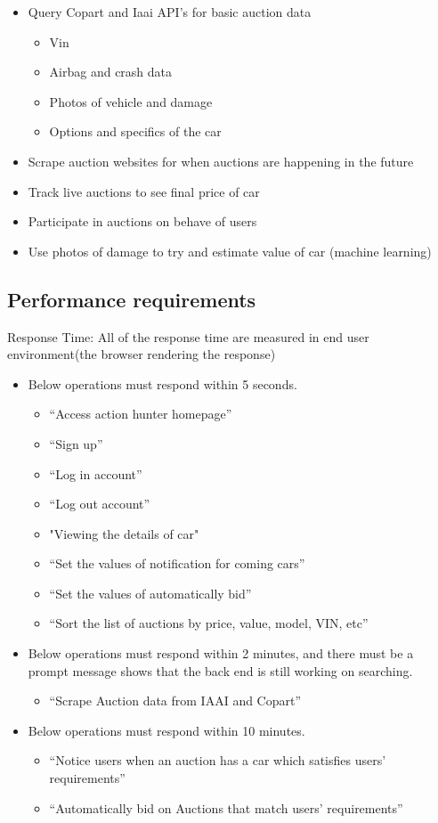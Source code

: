 \documentclass[draftclsnofoot,onecolumn,10pt]{IEEEtran}
\begin{document}
\begin{itemize}
    \item Query Copart and Iaai API's for basic auction data
    \begin{itemize}
        \item Vin
        \item Airbag and crash data
        \item Photos of vehicle and damage
        \item Options and specifics of the car
    \end{itemize}
    \item Scrape auction websites for when auctions are happening in the future
    \item Track live auctions to see final price of car
    \item Participate in auctions on behave of users
    \item Use photos of damage to try and estimate value of car (machine learning)
\end{itemize}

\subsection{Performance requirements}
Response Time: All of the response time are measured in end user environment(the browser rendering the response)
\begin{itemize}
\item Below operations must respond within 5 seconds.
\begin{itemize}
    \item “Access action hunter homepage”
    \item “Sign up”
    \item “Log in account”
    \item “Log out account”
    \item "Viewing the details of car"
    \item “Set the values of notification for coming cars”  
    \item “Set the values of automatically bid”
    \item “Sort the list of auctions by price, value, model, VIN, etc”
\end{itemize}
\item Below operations must respond within 2 minutes, and there must be a prompt message shows that the back end is still working on searching.
\begin{itemize}
    \item “Scrape Auction data from IAAI and Copart”
\end{itemize}
\item Below operations must respond within 10 minutes.
\begin{itemize}
    \item “Notice users when an auction has a car which satisfies users’ requirements”
    \item “Automatically bid on Auctions that match users’ requirements”
\end{itemize}
\end{itemize}
\end{document}
